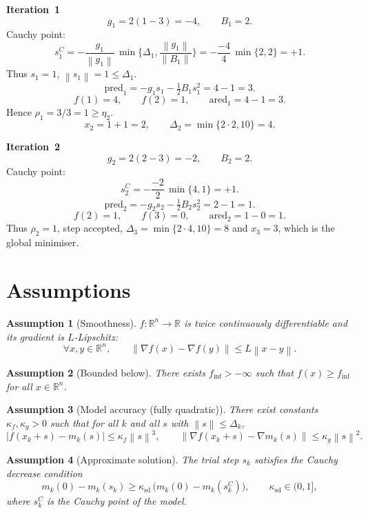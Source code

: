 \documentclass{article}
\newtheorem{assumption}{Assumption}
\newcommand{\norm}[1]{\left\lVert #1\right\rVert}
\newcommand{\R}{\mathbb{R}}
\begin{document}
\noindent\textbf{Iteration~1}\\
\[
g_1 = 2(1-3)=-4,\qquad B_1=2.
\]
Cauchy point:
\[
s_1^{C}= -\frac{g_1}{\norm{g_1}}\,\min\!\Big\{\Delta_1,\frac{\norm{g_1}}{\norm{B_1}}\Big\}
        = -\frac{-4}{4}\,\min\{2,2\}=+1 .
\]
Thus $s_1=1$, $\norm{s_1}=1\le\Delta_1$.
\[
\text{pred}_1 = -g_1 s_1-\tfrac12 B_1 s_1^2 = 4-1=3 .
\]
\[
f(1)=4,\qquad f(2)=1,\qquad 
\text{ared}_1 =4-1=3 .
\]
Hence $\rho_1=3/3=1\ge\eta_2$.
\[
x_2 = 1+1 = 2,\qquad 
\Delta_2 = \min\{2\cdot2,10\}=4 .
\]

\noindent\textbf{Iteration~2}\\
\[
g_2 = 2(2-3)=-2,\qquad B_2=2.
\]
Cauchy point:
\[
s_2^{C}= -\frac{-2}{2}\,\min\{4,1\}=+1 .
\]
\[
\text{pred}_2 = -g_2 s_2-\tfrac12 B_2 s_2^2 = 2-1=1 .
\]
\[
f(2)=1,\qquad f(3)=0,\qquad 
\text{ared}_2 =1-0=1 .
\]
Thus $\rho_2=1$, step accepted, $\Delta_3=\min\{2\cdot4,10\}=8$ and $x_3=3$, which is the global minimiser.

\section*{Assumptions}
\begin{assumption}[Smoothness]\label{as:smooth}
$f:\R^n\to\R$ is twice continuously differentiable and its gradient is $L$‑Lipschitz:
\[
\forall x,y\in\R^n,\qquad 
\norm{\nabla f(x)-\nabla f(y)}\le L\norm{x-y}.
\]
\end{assumption}
\begin{assumption}[Bounded below]\label{as:bound}
There exists $f_{\inf}>-\infty$ such that $f(x)\ge f_{\inf}$ for all $x\in\R^n$.
\end{assumption}
\begin{assumption}[Model accuracy (fully quadratic)]\label{as:quad}
There exist constants $\kappa_f,\kappa_g>0$ such that for all $k$ and all $s$ with $\norm{s}\le\Delta_k$,
\[
\big|f(x_k+s)-m_k(s)\big|\le \kappa_f\norm{s}^3,\qquad
\big\|\nabla f(x_k+s)-\nabla m_k(s)\big\|\le\kappa_g\norm{s}^2 .
\]
\end{assumption}
\begin{assumption}[Approximate solution]\label{as:approx}
The trial step $s_k$ satisfies the \emph{Cauchy decrease} condition
\[
m_k(0)-m_k(s_k)\ge \kappa_{\text{sd}}\,\big(m_k(0)-m_k(s_k^{C})\big),
\qquad \kappa_{\text{sd}}\in(0,1],
\]
where $s_k^{C}$ is the Cauchy point of the model.
\end{assumption}
\end{document}
